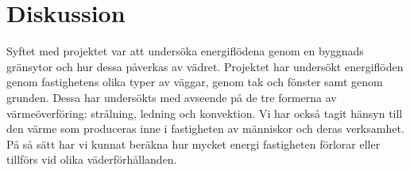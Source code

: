 \chapter{Diskussion}

Syftet med projektet var att undersöka energiflödena genom en byggnads gränsytor och hur dessa påverkas av vädret. Projektet har undersökt energiflöden genom fastighetens olika typer av väggar, genom tak och fönster samt genom grunden. Dessa har undersökts med avseende på de tre formerna av värmeöverföring: strålning, ledning och konvektion. Vi har också tagit hänsyn till den värme som produceras inne i fastigheten av människor och deras verksamhet. På så sätt har vi kunnat beräkna hur mycket energi fastigheten förlorar eller tillförs vid olika väderförhållanden.








